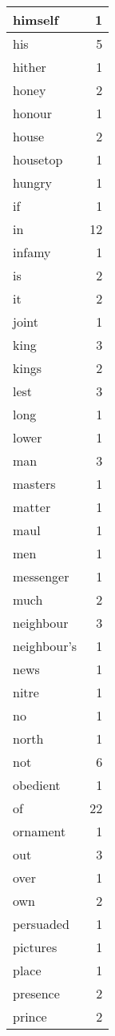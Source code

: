 \begin{center}
\begin{longtable}{l|r}
himself & 1\\ \hline 
his & 5\\ \hline 
hither & 1\\ \hline 
honey & 2\\ \hline 
honour & 1\\ \hline 
house & 2\\ \hline 
housetop & 1\\ \hline 
hungry & 1\\ \hline 
if & 1\\ \hline 
in & 12\\ \hline 
infamy & 1\\ \hline 
is & 2\\ \hline 
it & 2\\ \hline 
joint & 1\\ \hline 
king & 3\\ \hline 
kings & 2\\ \hline 
lest & 3\\ \hline 
long & 1\\ \hline 
lower & 1\\ \hline 
man & 3\\ \hline 
masters & 1\\ \hline 
matter & 1\\ \hline 
maul & 1\\ \hline 
men & 1\\ \hline 
messenger & 1\\ \hline 
much & 2\\ \hline 
neighbour & 3\\ \hline 
neighbour's & 1\\ \hline 
news & 1\\ \hline 
nitre & 1\\ \hline 
no & 1\\ \hline 
north & 1\\ \hline 
not & 6\\ \hline 
obedient & 1\\ \hline 
of & 22\\ \hline 
ornament & 1\\ \hline 
out & 3\\ \hline 
over & 1\\ \hline 
own & 2\\ \hline 
persuaded & 1\\ \hline 
pictures & 1\\ \hline 
place & 1\\ \hline 
presence & 2\\ \hline 
prince & 2\\ \hline 

\end{longtable}
\end{center}

